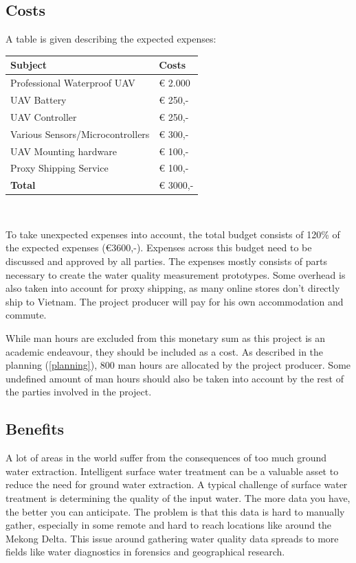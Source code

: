 \documentclass[11pt, a4paper]{article}
\begin{document}
\subsection{Costs}
A table is given describing the expected expenses:\\
\begin{center}
\begin{tabular}{ | l | l |}

    \hline
    \textbf{Subject} & \textbf{Costs} \\ \hline
    Professional Waterproof UAV & € 2.000 \\
    UAV Battery & € 250,- \\
    UAV Controller & € 250,- \\
    Various Sensors/Microcontrollers & € 300,- \\
    UAV Mounting hardware & € 100,- \\
    Proxy Shipping Service & € 100,- \\
    \hline
    \textbf{Total} & € 3000,- \\
    \hline
\end{tabular}\\
\end{center}

To take unexpected expenses into account, the total budget consists of 120\% of the expected expenses (€3600,-). Expenses across this budget need to be discussed and approved by all parties. The expenses mostly consists of parts necessary to create the water quality measurement prototypes. Some overhead is also taken into account for proxy shipping, as many online stores don't directly ship to Vietnam. The project producer will pay for his own accommodation and commute.

While man hours are excluded from this monetary sum as this project is an academic endeavour, they should be included as a cost. As described in the planning (\ref{planning}), 800 man hours are allocated by the project producer. Some undefined amount of man hours should also be taken into account by the rest of the parties involved in the project.

\subsection{Benefits}
A lot of areas in the world suffer from the consequences of too much ground water extraction. Intelligent surface water treatment can be a valuable asset to reduce the need for ground water extraction. A typical  challenge of surface water treatment is determining the quality of the input water. The more data you have, the better you can anticipate. The problem is that this data is hard to manually gather, especially in some remote and hard to reach locations like around the Mekong Delta. This issue around gathering water quality data spreads to more fields like water diagnostics in forensics and geographical research.
\end{document}
